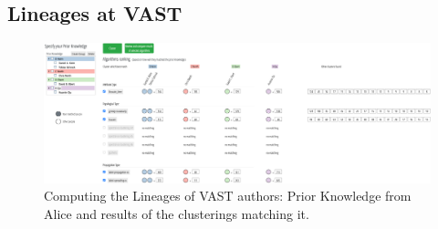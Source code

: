 \subsection{Lineages at VAST}
\label{sud:VAST}

\begin{figure}[tb]
\centering
\includegraphics[width=\linewidth]{static/figures/PK-Clustering/VISPaperFigures/Vast_PK_Clustering_View.png}
\caption{Computing the Lineages of VAST authors: Prior Knowledge from Alice and results of the clusterings matching it.}
\label{fig:PK-Vast_PK_Clustering_View}
\end{figure}

